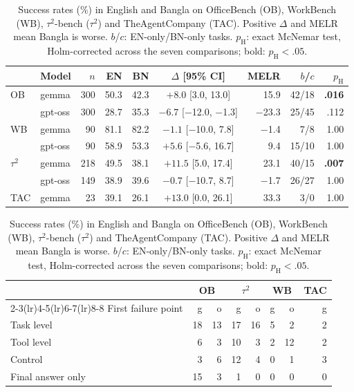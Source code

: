 \documentclass[11pt]{article}
\newcommand{\OB}{OfficeBench}
\newcommand{\WB}{WorkBench}
\newcommand{\TAU}{$\tau^2$-bench}
\newcommand{\TAC}{TheAgentCompany}
\begin{document}
\begin{table}[t]
\centering\footnotesize
\begin{minipage}[t]{0.585\textwidth}
\centering
\setlength{\tabcolsep}{2.4pt}
\begin{tabular}{llrrrcrrr}
\toprule
 & Model & $n$ & EN & BN & $\Delta$ [95\% CI] & MELR & $b$/$c$ & $p_{\mathrm{H}}$ \\
\midrule
OB  & gemma   & 300 & 50.3 & 42.3 & $+8.0$ [3.0, 13.0]        & 15.9   & 42/18 & \textbf{.016} \\
    & gpt-oss & 300 & 28.7 & 35.3 & $-6.7$ [$-$12.0, $-$1.3]  & $-$23.3 & 25/45 & .112 \\
WB  & gemma   & 90  & 81.1 & 82.2 & $-1.1$ [$-$10.0, 7.8]     & $-$1.4 & 7/8   & 1.00 \\
    & gpt-oss & 90  & 58.9 & 53.3 & $+5.6$ [$-$5.6, 16.7]     & 9.4    & 15/10 & 1.00 \\
$\tau^2$ & gemma & 218 & 49.5 & 38.1 & $+11.5$ [5.0, 17.4]   & 23.1   & 40/15 & \textbf{.007} \\
    & gpt-oss & 149 & 38.9 & 39.6 & $-0.7$ [$-$10.7, 8.7]     & $-$1.7 & 26/27 & 1.00 \\
TAC & gemma   & 23  & 39.1 & 26.1 & $+13.0$ [0.0, 26.1]       & 33.3   & 3/0   & 1.00 \\
\bottomrule
\end{tabular}
\caption{Success rates (\%) in English and Bangla on \OB{} (OB), \WB{} (WB), \TAU{} ($\tau^2$)
and \TAC{} (TAC). Positive $\Delta$ and MELR mean Bangla is worse. $b$/$c$: EN-only/BN-only tasks.
$p_{\mathrm{H}}$: exact McNemar test, Holm-corrected across the seven comparisons; bold:
$p_{\mathrm{H}}<.05$.}
\label{tab:rq1}
\end{minipage}\hfill
\begin{minipage}[t]{0.395\textwidth}
\centering
\setlength{\tabcolsep}{2.0pt}
\begin{tabular}{lrrrrrrr}
\toprule
 & \multicolumn{2}{c}{OB} & \multicolumn{2}{c}{$\tau^2$} & \multicolumn{2}{c}{WB} & TAC \\
\cmidrule(lr){2-3}\cmidrule(lr){4-5}\cmidrule(lr){6-7}\cmidrule(lr){8-8}
First failure point & g & o & g & o & g & o & g \\
\midrule
Task level & 18 & 13 & 17 & 16 & 5 & 2  & 2 \\
Tool level & 6  & 3  & 10 & 3  & 2 & 12 & 2 \\
Control & 3  & 6  & 12 & 4  & 0 & 1  & 3 \\
Final answer only & 15 & 3  & 1  & 0  & 0 & 0  & 0 \\

\end{tabular}
\end{minipage}
\end{table}
\end{document}
